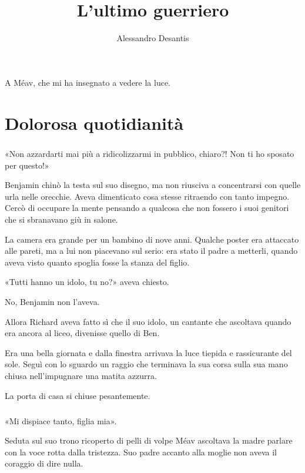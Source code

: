 \documentclass[a4paper,12pt]{book}
\title{L'ultimo guerriero}
\author{Alessandro Desantis}
\date{}
\begin{document}

\maketitle

\begin{flushright}
A Méav, che mi ha insegnato a vedere la luce.
\end{flushright}

\chapter{Dolorosa quotidianità}


\paragraph{}
«Non azzardarti mai più a ridicolizzarmi in pubblico, chiaro?! Non ti ho
sposato per questo!»

Benjamin chinò la testa sul suo disegno, ma non riusciva a concentrarsi con
quelle urla nelle orecchie. Aveva dimenticato cosa stesse ritraendo con tanto
impegno. Cercò di occupare la mente pensando a qualcosa che non fossero i suoi
genitori che si sbranavano giù in salone.

La camera era grande per un bambino di nove anni. Qualche poster era attaccato
alle pareti, ma a lui non piacevano sul serio: era stato il padre a metterli,
quando aveva visto quanto spoglia fosse la stanza del figlio.

«Tutti hanno un idolo, tu no?» aveva chiesto.

No, Benjamin non l’aveva.

Allora Richard aveva fatto sì che il suo idolo, un cantante che ascoltava
quando era ancora al liceo, divenisse quello di Ben.

Era una bella giornata e dalla finestra arrivava la luce tiepida e rassicurante
del sole. Seguì con lo sguardo un raggio che terminava la sua corsa sulla sua
mano chiusa nell’impugnare una matita azzurra.

La porta di casa si chiuse pesantemente.

\paragraph{}
«Mi dispiace tanto, figlia mia».

Seduta sul suo trono ricoperto di pelli di volpe Méav ascoltava la madre
parlare con la voce rotta dalla tristezza. Suo padre accanto alla moglie non
aveva il coraggio di dire nulla.
\end{document}
